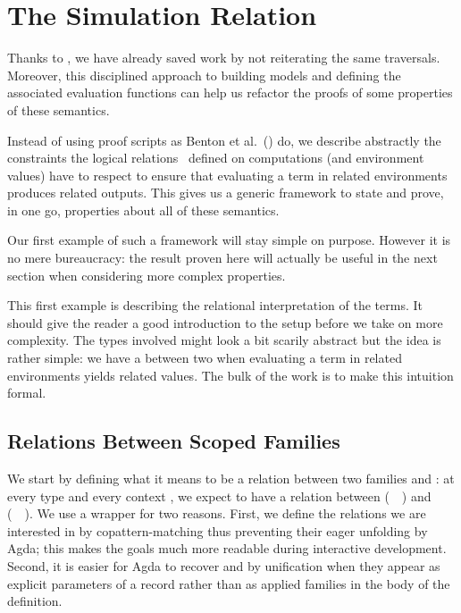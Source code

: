 \chapter{The Simulation Relation}

Thanks to , we have already saved work by not reiterating the
same traversals. Moreover, this disciplined approach to building models and
defining the associated evaluation functions can help us refactor the proofs
of some properties of these semantics.

Instead of using proof scripts as Benton et al.~(\citeyear{benton2012strongly})
do, we describe abstractly the constraints the logical relations~\cite{reynolds1983types}
defined on computations (and environment values) have to respect to ensure
that evaluating a term in related environments
produces related outputs. This gives us a generic framework to
state and prove, in one go, properties about all of these semantics.

Our first example of such a framework will stay simple on purpose.
However it is no mere bureaucracy: the
result proven here will actually be useful in the next section
when considering more complex properties.

This first example is describing the relational interpretation of the terms.
It should give the reader a good introduction to the setup before we take on
more complexity. The types involved might look a bit scarily abstract but the
idea is rather simple: we have a  between two 
when evaluating a term in related environments yields related values. The bulk
of the work is to make this intuition formal.

\section{Relations Between Scoped Families}

We start by defining what it means to be a relation between two 
families  and : at every type  and every context , we
expect to have a relation between (~~) and (~~).
We use a  wrapper for two reasons. First, we define the relations we
are interested in by copattern-matching thus preventing their eager unfolding by
Agda; this makes the goals much more readable during interactive development.
Second, it is easier for Agda to recover  and  by unification when
they appear as explicit parameters of a record rather than as applied families
in the body of the definition.

